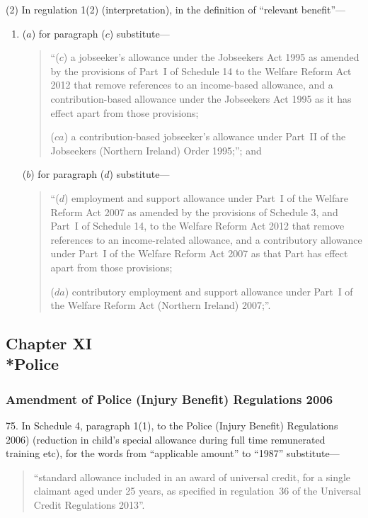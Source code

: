 \documentclass[12pt,a4paper]{article}
\begin{document}
(2) In regulation 1(2) (interpretation), in the definition of “relevant benefit”—
\begin{enumerate}\item[]
($a$) for paragraph ($c$)  substitute—
\begin{quotation}
“($c$) a jobseeker’s allowance under the Jobseekers Act 1995 as amended by the provisions of Part~I of Schedule 14 to the Welfare Reform Act 2012 that remove references to an income-based allowance, and a contribution-based allowance under the Jobseekers Act 1995 as it has effect apart from those provisions;

($ca$) a contribution-based jobseeker’s allowance under Part~II of the Jobseekers (Northern Ireland) Order 1995;”; and
\end{quotation}

($b$) for paragraph ($d$)  substitute—
\begin{quotation}
“($d$) employment and support allowance under Part~I of the Welfare Reform Act 2007 as amended by the provisions of Schedule 3, and Part~I of Schedule 14, to the Welfare Reform Act 2012 that remove references to an income-related allowance, and a contributory allowance under Part~I of the Welfare Reform Act 2007 as that Part has effect apart from those provisions;

($da$) contributory employment and support allowance under Part~I of the Welfare Reform Act (Northern Ireland) 2007;”.
\end{quotation}
\end{enumerate}

\subsection[Chapter XI --- Police]{Chapter XI\\*Police}

\renewcommand\parthead{--- Part III Chapter XI}

\subsubsection[75. Amendment of Police (Injury Benefit) Regulations 2006]{Amendment of Police (Injury Benefit) Regulations 2006}

75.  In Schedule 4, paragraph 1(1), to the Police (Injury Benefit) Regulations 2006) (reduction in child’s special allowance during full time remunerated training etc), for the words from “applicable amount” to “1987” substitute—
\begin{quotation}
“standard allowance included in an award of universal credit, for a single claimant aged under 25 years, as specified in regulation~36 of the Universal Credit Regulations 2013”.
\end{quotation}
\end{document}
